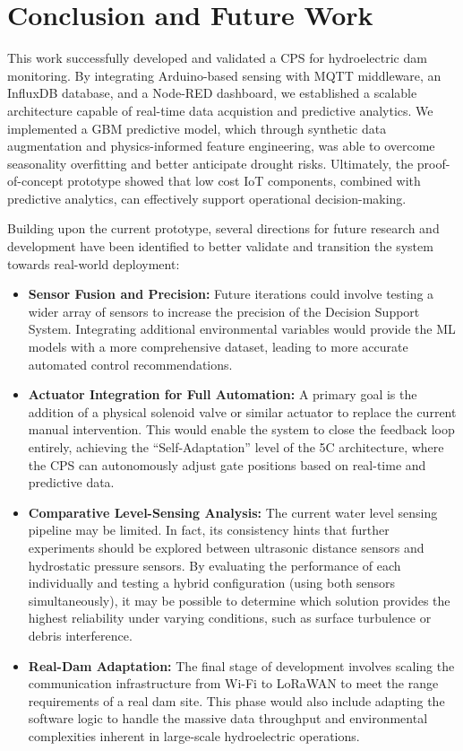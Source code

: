 \section{Conclusion and Future Work}\label{sec:conclusion}

This work successfully developed and validated a CPS for hydroelectric dam monitoring. By integrating Arduino-based sensing with MQTT middleware, an InfluxDB database, and a Node-RED dashboard, we established a scalable architecture capable of real-time data acquistion and predictive analytics. We implemented a GBM predictive model, which through synthetic data augmentation and physics-informed feature engineering, was able to overcome seasonality overfitting and better anticipate drought risks. Ultimately, the proof-of-concept prototype showed that low cost IoT components, combined with predictive analytics, can effectively support operational decision-making.

Building upon the current prototype, several directions for future research and development have been identified to better validate and transition the system towards real-world deployment:

\begin{itemize}
    \item \textbf{Sensor Fusion and Precision:} Future iterations could involve testing a wider array of sensors to increase the precision of the Decision Support System. Integrating additional environmental variables would provide the ML models with a more comprehensive dataset, leading to more accurate automated control recommendations.
    \item \textbf{Actuator Integration for Full Automation:} A primary goal is the addition of a physical solenoid valve or similar actuator to replace the current manual intervention. This would enable the system to close the feedback loop entirely, achieving the ``Self-Adaptation'' level of the 5C architecture, where the CPS can autonomously adjust gate positions based on real-time and predictive data.
    \item \textbf{Comparative Level-Sensing Analysis:} The current water level sensing pipeline may be limited. In fact, its consistency hints that further experiments should be explored between ultrasonic distance sensors and hydrostatic pressure sensors. By evaluating the performance of each individually and testing a hybrid configuration (using both sensors simultaneously), it may be possible to determine which solution provides the highest reliability under varying conditions, such as surface turbulence or debris interference.
    \item \textbf{Real-Dam Adaptation:} The final stage of development involves scaling the communication infrastructure from Wi-Fi to LoRaWAN to meet the range requirements of a real dam site. This phase would also include adapting the software logic to handle the massive data throughput and environmental complexities inherent in large-scale hydroelectric operations.
\end{itemize}

